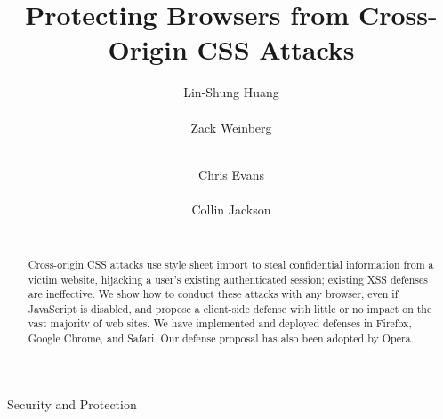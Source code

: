 \documentclass{acm_proc_article-sp}
\begin{document}
\itemsep 0pt
\partopsep 0pt
\topsep 0pt
\makeatletter
\def\paragraph{%
    \@startsection{paragraph}{4}{\z@}{\z@ \@plus \p@}{-5\p@}{\subsecfnt}}
\makeatother
\renewenvironment{itemize}{%
 \begin{list}{$\bullet$}
  {\setlength{\itemsep}{0pt}
   \setlength{\parsep}{3pt}
   \setlength{\topsep}{3pt}
   \setlength{\partopsep}{0pt}
   \setlength{\leftmargin}{1.5em}
   \setlength{\labelwidth}{1em}
   \setlength{\labelsep}{0.5em}}}
  {\end{list}}

\title{Protecting Browsers from Cross-Origin CSS Attacks}
\author{
\alignauthor
Lin-Shung Huang\\
      \\
\alignauthor
Zack Weinberg\\
      \\
\and
\alignauthor
Chris Evans\\
      \\
\alignauthor
Collin Jackson\\
      \\
}

\newcommand{\todo}[1]{\textbf{[TODO: #1]}}

\maketitle
\begin{abstract}
Cross-origin CSS attacks use style sheet import to steal confidential
information from a victim website, hijacking a user's existing
authenticated session; existing XSS defenses are ineffective.  We show
how to conduct these attacks with any browser, even if JavaScript is
disabled, and propose a client-side defense with little or no impact
on the vast majority of web sites. We have implemented and deployed
defenses in Firefox, Google Chrome, and Safari. Our defense proposal
has also been adopted by Opera.
\end{abstract}

                {Security and Protection}
\end{document}
